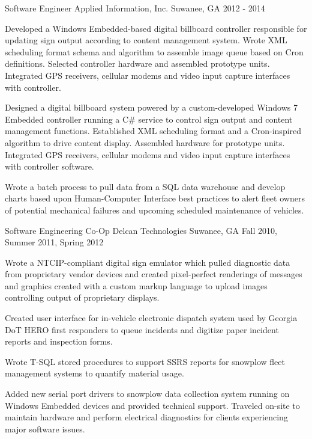 \begin{cventries}
  \cventry
    {Software Engineer} %
    {Applied Information, Inc.} %
    {Suwanee, GA} %
    {2012 - 2014} %
    {
      \begin{cvitems} %
        \item {Developed a Windows Embedded-based digital billboard controller responsible for updating sign output according to content management system. Wrote XML scheduling format schema and algorithm to assemble image queue based on Cron definitions. Selected controller hardware and assembled prototype units. Integrated GPS receivers, cellular modems and video input capture interfaces with controller.}
        \item {Designed a digital billboard system powered by a custom-developed Windows 7 Embedded controller running a C\# service to control sign output and content management functions. Established XML scheduling format and a Cron-inspired algorithm to drive content display. Assembled hardware for prototype units. Integrated GPS receivers, cellular modems and video input capture interfaces with controller software.}
	\item {Wrote a batch process to pull data from a SQL data warehouse and develop charts based upon Human-Computer Interface best practices to alert fleet owners of potential mechanical failures and upcoming scheduled maintenance of vehicles.}
      \end{cvitems}
    }

  \cventry
    {Software Engineering Co-Op} %
    {Delcan Technologies} %
    {Suwanee, GA} %
    {Fall 2010, Summer 2011, Spring 2012} %
    {
      \begin{cvitems} %
        \item {Wrote a NTCIP-compliant digital sign emulator which pulled diagnostic data from proprietary vendor devices and created pixel-perfect renderings of messages and graphics created with a custom markup language to upload images controlling output of proprietary displays.}
		\item {Created user interface for in-vehicle electronic dispatch system used by Georgia DoT HERO first responders to queue incidents and digitize paper incident reports and inspection forms.}
		\item {Wrote T-SQL stored procedures to support SSRS reports for snowplow fleet management systems to quantify material usage.}
		\item {Added new serial port drivers to snowplow data collection system running on Windows Embedded devices and provided technical support. Traveled on-site to maintain hardware and perform electrical diagnostics for clients experiencing major software issues.}
      \end{cvitems}
    }

\end{cventries}
